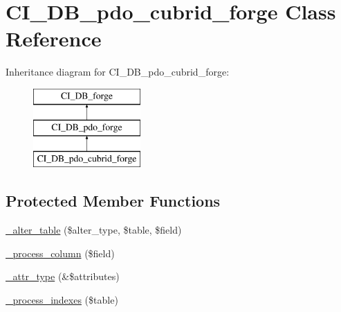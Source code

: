 \hypertarget{class_c_i___d_b__pdo__cubrid__forge}{}\section{C\+I\+\_\+\+D\+B\+\_\+pdo\+\_\+cubrid\+\_\+forge Class Reference}
\label{class_c_i___d_b__pdo__cubrid__forge}
Inheritance diagram for C\+I\+\_\+\+D\+B\+\_\+pdo\+\_\+cubrid\+\_\+forge\+:\begin{figure}[H]
\begin{center}
\leavevmode
\includegraphics[height=3.000000cm]{class_c_i___d_b__pdo__cubrid__forge}
\end{center}
\end{figure}
\subsection*{Protected Member Functions}
\begin{DoxyCompactItemize}
\item 
\mbox{\hyperlink{class_c_i___d_b__pdo__cubrid__forge_a41c6cae02f2fda8b429ad0afb9509426}{\+\_\+alter\+\_\+table}} (\$alter\+\_\+type, \$table, \$field)
\item 
\mbox{\hyperlink{class_c_i___d_b__pdo__cubrid__forge_a8f38f1c5b5dddecca4befbe393f3f299}{\+\_\+process\+\_\+column}} (\$field)
\item 
\mbox{\hyperlink{class_c_i___d_b__pdo__cubrid__forge_a8553be952084c6f7cdfff370a1d14f6b}{\+\_\+attr\+\_\+type}} (\&\$attributes)
\item 
\mbox{\hyperlink{class_c_i___d_b__pdo__cubrid__forge_ae0bdb4ea3418590d1894c5b621b5ca50}{\+\_\+process\+\_\+indexes}} (\$table)
\end{DoxyCompactItemize}
